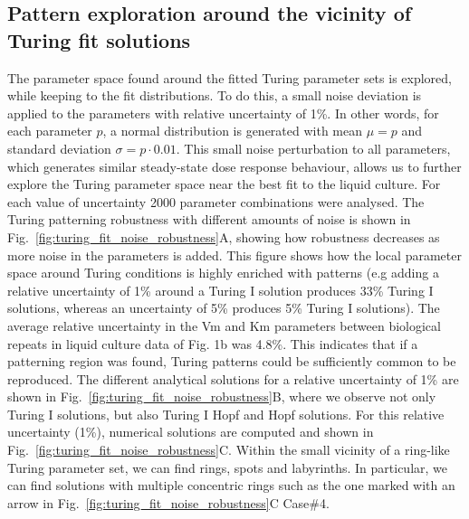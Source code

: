\subsection{Pattern exploration around the vicinity of Turing fit solutions}
The parameter space found around the fitted Turing parameter sets is explored, while keeping to the fit distributions. To do this, a small noise deviation is applied to the parameters with relative uncertainty of 1\%.
In other words, for each parameter $p$, a normal distribution is generated with mean $\mu=p$ and standard deviation $\sigma=p\cdot 0.01$.
This small noise perturbation to all parameters, which generates similar steady-state dose response behaviour, allows us to further explore the Turing parameter space near the best fit to the liquid culture.
For each value of uncertainty 2000 parameter combinations were analysed.
The Turing patterning robustness with different amounts of noise is shown in Fig.~\ref{fig:turing_fit_noise_robustness}A, showing how robustness decreases as more noise in the parameters is added.
This figure shows how the local parameter space around Turing conditions is highly enriched with patterns (e.g adding a relative uncertainty of 1\% around a Turing I solution produces 33\% Turing I solutions, whereas an uncertainty of 5\% produces 5\% Turing I solutions).
The average relative uncertainty in the Vm and Km parameters between biological repeats in liquid culture data of Fig. 1b was 4.8\%. This indicates that if a patterning region was found, Turing patterns could be sufficiently common to be reproduced.%
The different analytical solutions for a relative uncertainty of 1\% are shown in Fig.~\ref{fig:turing_fit_noise_robustness}B, where we observe not only Turing I solutions, but also Turing I Hopf and Hopf solutions.
For this relative uncertainty (1\%), numerical solutions are computed and shown in Fig.~\ref{fig:turing_fit_noise_robustness}C.
Within the small vicinity of a ring-like Turing parameter set, we can find rings, spots and labyrinths.
In particular, we can find solutions with multiple concentric rings such as the one marked with an arrow in Fig.~\ref{fig:turing_fit_noise_robustness}C Case\#4.

